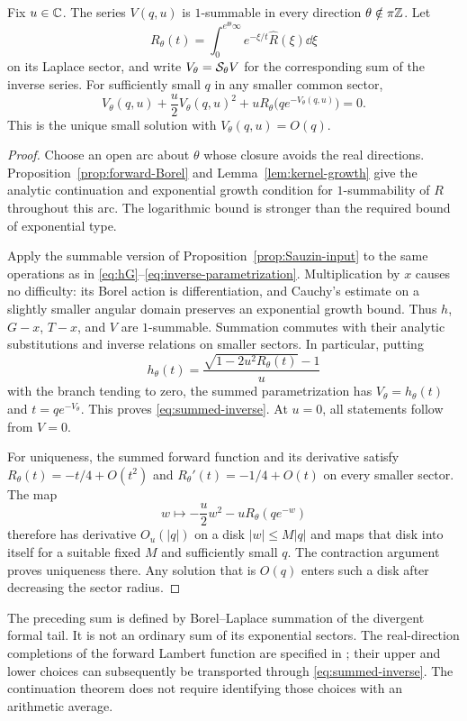 \begin{theorem}
\label{thm:inverse-summability}
Fix $u\in\mathbb C$. The series $V(q,u)$ is $1$-summable in every direction
$\theta\notin\pi\mathbb Z$. Let
\[
 R_\theta(t)=\int_0^{e^{\ii\theta}\infty}
                 e^{-\xi/t}\widehat R(\xi)\dd\xi
\]
on its Laplace sector, and write $V_\theta=\mathcal S_\theta V$ for the
corresponding sum of the inverse series. For sufficiently small $q$
in any smaller common sector,
\begin{equation}\label{eq:summed-inverse}
 V_\theta(q,u)+\frac u2V_\theta(q,u)^2
       +uR_\theta\bigl(qe^{-V_\theta(q,u)}\bigr)=0.
\end{equation}
This is the unique small solution with $V_\theta(q,u)=O(q)$.
\end{theorem}
\begin{proof}
Choose an open arc about $\theta$ whose closure avoids the real
directions. Proposition~\ref{prop:forward-Borel} and
Lemma~\ref{lem:kernel-growth} give the analytic continuation and exponential
growth condition for $1$-summability of $R$ throughout this arc.
The logarithmic bound is stronger than the required bound of exponential
type.

Apply the summable version of Proposition~\ref{prop:Sauzin-input} to the
same operations as in \eqref{eq:hG}--\eqref{eq:inverse-parametrization}.
Multiplication by $x$ causes no difficulty: its Borel action is
differentiation, and Cauchy's estimate on a slightly smaller angular
domain preserves an exponential growth bound. Thus $h$, $G-x$, $T-x$,
and $V$ are $1$-summable. Summation commutes with their analytic
substitutions and inverse relations on smaller sectors. In particular,
putting
\[
 h_\theta(t)=\frac{\sqrt{1-2u^2R_\theta(t)}-1}{u}
\]
with the branch tending to zero, the summed parametrization has
$V_\theta=h_\theta(t)$ and $t=qe^{-V_\theta}$. This proves
\eqref{eq:summed-inverse}. At $u=0$, all statements follow from $V=0$.

For uniqueness, the summed forward function and its derivative satisfy
$R_\theta(t)=-t/4+O(t^2)$ and
$R_\theta'(t)=-1/4+O(t)$ on every smaller sector.
The map
\[
 w\longmapsto-\frac u2w^2-uR_\theta(qe^{-w})
\]
therefore has derivative $O_u(|q|)$ on a disk $|w|\le M|q|$ and maps
that disk into itself for a suitable fixed $M$ and sufficiently small
$q$. The contraction argument proves uniqueness there. Any solution
that is $O(q)$ enters such a disk after decreasing the sector radius.
\end{proof}

The preceding sum is defined by Borel--Laplace summation of the divergent
formal tail. It is not an ordinary sum of its exponential sectors.
The real-direction completions of the forward Lambert function are
specified in \cite{incoming}; their upper and lower choices can subsequently
be transported through \eqref{eq:summed-inverse}. The continuation theorem
does not require identifying those choices with an arithmetic average.

